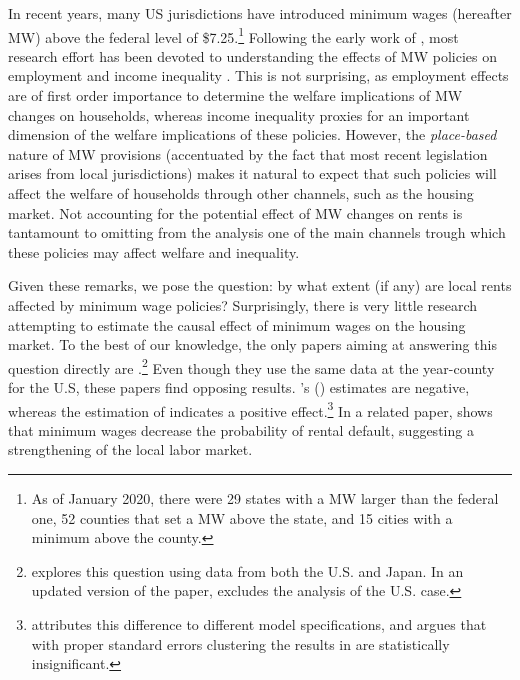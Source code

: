 
In recent years, many US jurisdictions have introduced minimum wages (hereafter MW) above the 
federal level of \$7.25.\footnote{As of January 2020, there were 29 states with a MW larger 
	than the federal one, 52 counties that set a MW above the state, and 15 cities with a 
	minimum above the county.}
Following the early work of \textcite{CardKrueger2000}, most research effort has been devoted 
to understanding the effects of MW policies on employment \parencite[e.g.,][]{Neumark2006, 
DubeEtAl2010, MeerWest2016, CegnizEtAl2019} and income inequality \parencite{Lee1999, 
AutorEtAl2016}. This is not surprising, as employment effects are of first order importance 
to determine the welfare implications of MW changes on households, whereas income inequality 
proxies for an important dimension of the welfare implications of these policies. However, the 
\textit{place-based} nature of MW provisions (accentuated by the fact that most recent 
legislation arises from local jurisdictions) makes it natural to expect that such policies 
will affect the welfare of households through other channels, such as the housing market. 
Not accounting for the potential effect of MW changes on rents is tantamount to omitting 
from the analysis one of the main channels trough which these policies may affect welfare 
and inequality.

Given these remarks, we pose the question: by what extent (if any) are local rents affected 
by minimum wage policies? Surprisingly, there is very little research attempting to estimate 
the causal effect of minimum wages on the housing market. To the best of our knowledge, the 
only papers aiming at answering this question directly are \textcite{Yamagishi2019, 
Yamagishi2020, Tidemann2018}.\footnote{\textcite{Yamagishi2019} explores this question using 
data from both the U.S. and Japan. In an updated version of the paper, 
\textcite{Yamagishi2020} excludes the analysis of the U.S. case.} Even though they use the 
same data at the year-county for the U.S, these papers find opposing results. 
\citeauthor{Tidemann2018}'s (\citeyear{Tidemann2018}) estimates are negative, whereas the 
estimation of \textcite{Yamagishi2019} indicates a positive effect.\footnote{
	\textcite{Yamagishi2019} attributes this difference to different model 
	specifications, and argues that with proper standard errors clustering the results in 
	\textcite{Tidemann2018} are statistically insignificant.} 
In a related paper, \textcite{AgarwalEtAl2019} shows that minimum wages decrease 
the probability of rental default, suggesting a strengthening of the local labor market.

